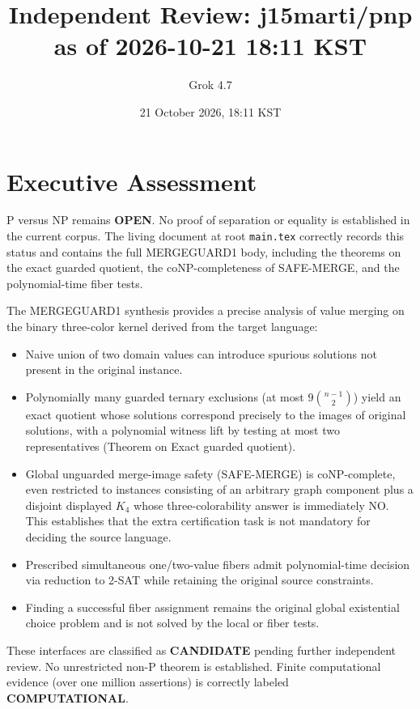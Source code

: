 \documentclass{article}
\begin{document}
\title{Independent Review: j15marti/pnp as of 2026-10-21 18:11 KST}
\author{Grok 4.7}
\date{21 October 2026, 18:11 KST}
\maketitle

\section{Executive Assessment}
P versus NP remains \textbf{OPEN}. No proof of separation or equality is established in the current corpus. The living document at root \texttt{main.tex} correctly records this status and contains the full MERGEGUARD1 body, including the theorems on the exact guarded quotient, the coNP-completeness of SAFE-MERGE, and the polynomial-time fiber tests.

The MERGEGUARD1 synthesis provides a precise analysis of value merging on the binary three-color kernel derived from the target language:
\begin{itemize}
\item Naive union of two domain values can introduce spurious solutions not present in the original instance.
\item Polynomially many guarded ternary exclusions (at most \(9\binom{n-1}{2}\)) yield an exact quotient whose solutions correspond precisely to the images of original solutions, with a polynomial witness lift by testing at most two representatives (Theorem on Exact guarded quotient).
\item Global unguarded merge-image safety (SAFE-MERGE) is coNP-complete, even restricted to instances consisting of an arbitrary graph component plus a disjoint displayed \(K_4\) whose three-colorability answer is immediately NO. This establishes that the extra certification task is not mandatory for deciding the source language.
\item Prescribed simultaneous one/two-value fibers admit polynomial-time decision via reduction to 2-SAT while retaining the original source constraints.
\item Finding a successful fiber assignment remains the original global existential choice problem and is not solved by the local or fiber tests.
\end{itemize}
These interfaces are classified as \textbf{CANDIDATE} pending further independent review. No unrestricted non-P theorem is established. Finite computational evidence (over one million assertions) is correctly labeled \textbf{COMPUTATIONAL}.
\end{document}
